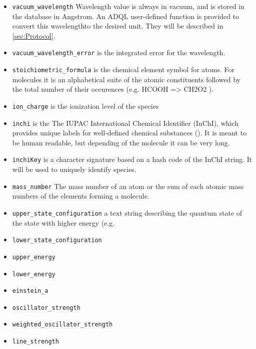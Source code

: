 \documentclass[11pt,a4paper]{ivoa}
\begin{document}
\begin{itemize}
\item \texttt{vacuum\_wavelength} 
Wavelength value is always in vacuum, and  is stored in the database in Angstrom. 
An  ADQL user-defined function is provided to convert this wavelengthto the desired 
unit. They will be described in
\ref{sec:Protocol}.
\\
\item \texttt{vacuum\_wavelength\_error} is the integrated error for the wavelength.

\item \texttt{stoichiometric\_formula} is the chemical element symbol for atoms. For molecules 
it is an alphabetical suite of the atomic constituents followed by the total number of their 
occurences (e.g. HCOOH => CH2O2 ).

\item \texttt{ion\_charge} is the ionization level of the species

\item \texttt{inchi} is the The IUPAC International Chemical Identifier (InChI), which  provides unique labels for well-defined chemical substances (\cite{INCHI}). It is meant to be human readable, but depending of the molecule it can be very long.
\item \texttt{inchiKey} is a character signature based on a hash code of the InChI string. It will be used to uniquely identify species.

\item \texttt{mass\_number} The mass number of an atom or the sum of each atomic mass numbers of the elements forming a molecule.

\item \texttt{upper\_state\_configuration} a text string describing the quantum state of the state with higher energy (e.g. 
\item \texttt{lower\_state\_configuration} 
\item \texttt{upper\_energy} 
\item \texttt{lower\_energy} 

\item \texttt{einstein\_a}
\item \texttt{oscillator\_strength}
\item \texttt{weighted\_oscillator\_strength}
\item \texttt{line\_strength}



\end{itemize}
\end{document}
